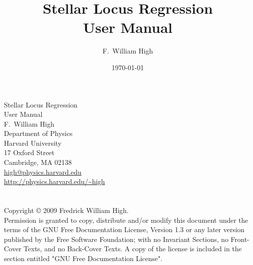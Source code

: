 \documentclass{report}
\begin{document}
\title{Stellar Locus Regression\\User Manual}

\author{F.\ William High}

\date{\today}



\begin{titlepage}
\begin{minipage}{\textwidth}
\begin{center}
\Huge
Stellar Locus Regression\\User Manual\\
\vspace{3cm}
\Large
F.~William High\\
\vspace{3cm}
\large
Department of Physics\\ Harvard
University\\ 17 Oxford Street\\ Cambridge, MA 02138\\
\href{mailto:high@physics.harvard.edu}{high@physics.harvard.edu}\\
\url{http://physics.harvard.edu/~high}
\end{center}
\end{minipage}
\end{titlepage}

\begin{minipage}{\textwidth}

\section*{}

Copyright \copyright{}  2009  Fredrick William High.\\
Permission is granted to copy, distribute and/or modify this document
under the terms of the GNU Free Documentation License, Version 1.3
or any later version published by the Free Software Foundation;
with no Invariant Sections, no Front-Cover Texts, and no Back-Cover Texts.
A copy of the license is included in the section entitled "GNU
Free Documentation License".



\end{minipage}
\end{document}
